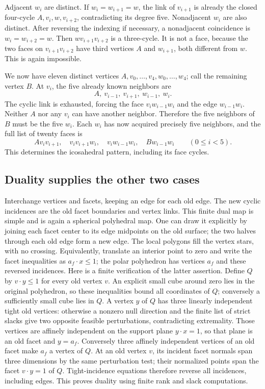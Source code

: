 Adjacent $w_i$ are distinct. If $w_i=w_{i+1}=w$, the link of
$v_{i+1}$ is already the closed four-cycle
$A,v_i,w,v_{i+2}$, contradicting its degree five. Nonadjacent $w_i$
are also distinct. After reversing the indexing if necessary, a
nonadjacent coincidence is $w_i=w_{i+2}=w$. Then
$wv_{i+1}v_{i+2}$ is a three-cycle. It is not a face, because the two
faces on $v_{i+1}v_{i+2}$ have third vertices $A$ and $w_{i+1}$,
both different from $w$. This is again impossible.

We now have eleven distinct vertices $A,v_0,\ldots,v_4,w_0,\ldots,w_4$;
call the remaining vertex $B$. At $v_i$, the five already known
neighbors are
\[
 A,\ v_{i-1},\ v_{i+1},\ w_{i-1},\ w_i.
\]
The cyclic link is exhausted, forcing the face $v_iw_{i-1}w_i$ and
the edge $w_{i-1}w_i$. Neither $A$ nor any $v_i$ can have another
neighbor. Therefore the five neighbors of $B$ must be the five
$w_i$. Each $w_i$ has now acquired precisely five neighbors, and
the full list of twenty faces is
\[
 Av_iv_{i+1},\quad v_iv_{i+1}w_i,\quad
 v_iw_{i-1}w_i,\quad Bw_{i-1}w_i\qquad(0\leq i<5).
\]
This determines the icosahedral pattern, including its face cycles.

\subsection{Duality supplies the other two cases}

Interchange vertices and facets, keeping an edge for each old edge.
The new cyclic incidences are the old facet boundaries and vertex
links. This finite dual map is simple and is again a spherical
polyhedral map. One can draw it explicitly by joining each facet
center to its edge midpoints on the old surface; the two halves
through each old edge form a new edge. The local polygons fill the
vertex stars, with no crossing. Equivalently, translate an interior
point to zero and write the facet inequalities as $a_f\cdot x\leq1$;
the polar polyhedron has vertices $a_f$ and these reversed incidences.
Here is a finite verification of the latter assertion. Define $Q$ by
$v\cdot y\leq1$ for every old vertex $v$. An explicit small cube around
zero lies in the original polyhedron, so these inequalities bound all
coordinates of $Q$; conversely a sufficiently small cube lies in $Q$.
A vertex $y$ of $Q$ has three linearly independent tight old vertices:
otherwise a nonzero null direction and the finite list of strict slacks
give two opposite feasible perturbations, contradicting extremality.
Those vertices are affinely independent on the support plane
$y\cdot x=1$, so that plane is an old facet and $y=a_f$.
Conversely three affinely independent vertices of an old facet make
$a_f$ a vertex of $Q$. At an old vertex $v$, its incident facet normals
span three dimensions by the same perturbation test; their normalized
points span the facet $v\cdot y=1$ of $Q$. Tight-incidence equations
therefore reverse all incidences, including edges. This proves duality
using finite rank and slack computations.

